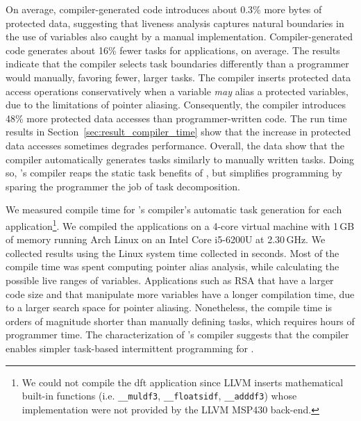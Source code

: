 On average, compiler-generated code introduces about 0.3\% more bytes of
protected data, suggesting that liveness analysis captures natural boundaries
in the use of variables also caught by a manual implementation.
Compiler-generated code generates about 16\% fewer tasks for applications, on
average.  The results indicate that the \sys compiler selects task boundaries
differently than a programmer would manually, favoring fewer, larger tasks.
The \sys compiler inserts protected data access operations conservatively when
a variable {\em may} alias a protected variables, due to the limitations of
pointer aliasing. Consequently, the \sys compiler introduces 48\% more
protected data accesses than programmer-written code. The run time results in
Section~\ref{sec:result_compiler_time} show that the increase in protected data
accesses sometimes degrades performance. Overall, the data show that the
compiler automatically generates tasks similarly to manually written tasks.
Doing so, \sys's compiler reaps the static task benefits of \sys, but
simplifies programming by sparing the programmer the job of task decomposition. 

We measured compile time for \sys's compiler's automatic task generation for
each application\footnote{We could not compile the dft application since LLVM
inserts mathematical built-in functions (i.e. \texttt{\_\_muldf3},
\texttt{\_\_floatsidf}, \texttt{\_\_adddf3}) whose implementation were not
provided by the LLVM MSP430 back-end.}. We compiled the applications on a
4-core virtual machine with 1\,GB of memory running Arch Linux on an Intel Core
i5-6200U at 2.30\,GHz. We collected results using the Linux system time
collected in seconds. Most of the compile time was spent computing pointer
alias analysis, while calculating the possible live ranges of variables.
Applications such as RSA that have a larger code size and that manipulate more
variables have a longer compilation time, due to a larger search space for
pointer aliasing. Nonetheless, the compile time is orders of magnitude shorter
than manually defining tasks, which requires hours of programmer time. The
characterization of \sys's compiler suggests that the \sys compiler enables
simpler task-based intermittent programming for \sys.


